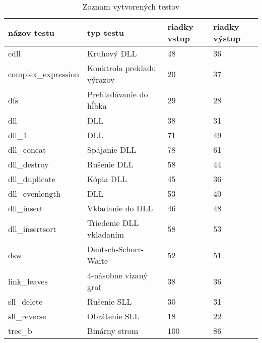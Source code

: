 \begin{table}[H]
\centering

\begin{tabular}{l|l|l|l}
\textbf{názov testu} & \textbf{typ testu}         & \textbf{riadky vstup} & \textbf{riadky výstup} \\ \hline
cdll                 & Kruhový DLL      & 48                                      & 36                                       \\
complex\_expression  & Konktrola prekladu výrazov & 20                                      & 37                                       \\
dfs                  & Prehľadávanie do hĺbka     & 29                                      & 28                                       \\
dll                  & DLL                & 38                                      & 31                                       \\
dll\_1               & DLL               & 71                                      & 49                                       \\
dll\_concat          & Spájanie DLL               & 78                                      & 61                                       \\
dll\_destroy         & Rušenie DLL                & 58                                      & 44                                       \\
dll\_duplicate       & Kópia DLL                  & 45                                      & 36                                       \\
dll\_evenlength      & DLL              & 53                                      & 40                                       \\
dll\_insert          & Vkladanie do DLL           & 46                                      & 48                                       \\
dll\_insertsort      & Triedenie DLL vkladaním    & 58                                      & 53                                       \\
dsw                  & Deutsch-Schorr-Waite       & 52                                      & 51                                       \\
link\_leaves         & 4-násobne vizaný graf & 38                                      & 36                                       \\
sll\_delete          & Rušenie SLL                & 30                                      & 31                                       \\
sll\_reverse         & Obrátenie SLL              & 18                                      & 22                                       \\
tree\_b              & Binárny strom         & 100                                     & 86                                      
\end{tabular}
\caption{Zoznam vytvorených testov}
\label{table:testy}
\end{table}